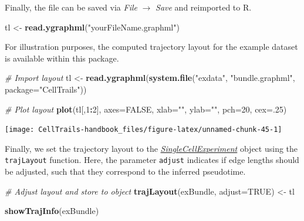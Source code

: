 \documentclass[]{book}
\newenvironment{Shaded}{\begin{snugshade}}{\end{snugshade}}
\newcommand{\KeywordTok}[1]{\textcolor[rgb]{0.13,0.29,0.53}{\textbf{#1}}}
\newcommand{\DataTypeTok}[1]{\textcolor[rgb]{0.13,0.29,0.53}{#1}}
\newcommand{\DecValTok}[1]{\textcolor[rgb]{0.00,0.00,0.81}{#1}}
\newcommand{\StringTok}[1]{\textcolor[rgb]{0.31,0.60,0.02}{#1}}
\newcommand{\CommentTok}[1]{\textcolor[rgb]{0.56,0.35,0.01}{\textit{#1}}}
\newcommand{\OtherTok}[1]{\textcolor[rgb]{0.56,0.35,0.01}{#1}}
\newcommand{\OperatorTok}[1]{\textcolor[rgb]{0.81,0.36,0.00}{\textbf{#1}}}
\newcommand{\NormalTok}[1]{#1}
\theoremstyle{definition}
\theoremstyle{definition}
\theoremstyle{definition}
\theoremstyle{remark}
\begin{document}
Finally, the file can be saved via \emph{File} \(\rightarrow\)
\emph{Save} and reimported to R.

\begin{Shaded}
\begin{Highlighting}[]
\NormalTok{tl <-}\StringTok{ }\KeywordTok{read.ygraphml}\NormalTok{(}\StringTok{"yourFileName.graphml"}\NormalTok{)}
\end{Highlighting}
\end{Shaded}

For illustration purposes, the computed trajectory layout for the
example dataset is available within this package.

\begin{Shaded}
\begin{Highlighting}[]
\CommentTok{# Import layout}
\NormalTok{tl <-}\StringTok{ }\KeywordTok{read.ygraphml}\NormalTok{(}\KeywordTok{system.file}\NormalTok{(}\StringTok{"exdata"}\NormalTok{, }\StringTok{"bundle.graphml"}\NormalTok{, }
                                \DataTypeTok{package=}\StringTok{"CellTrails"}\NormalTok{))}

\CommentTok{# Plot layout}
\KeywordTok{plot}\NormalTok{(tl[,}\DecValTok{1}\OperatorTok{:}\DecValTok{2}\NormalTok{], }\DataTypeTok{axes=}\OtherTok{FALSE}\NormalTok{, }\DataTypeTok{xlab=}\StringTok{""}\NormalTok{, }\DataTypeTok{ylab=}\StringTok{""}\NormalTok{, }\DataTypeTok{pch=}\DecValTok{20}\NormalTok{, }\DataTypeTok{cex=}\NormalTok{.}\DecValTok{25}\NormalTok{)}
\end{Highlighting}
\end{Shaded}

\texttt{[image: CellTrails-handbook\_files/figure-latex/unnamed-chunk-45-1]}

Finally, we set the trajectory layout to the
\emph{\href{http://bioconductor.org/packages/SingleCellExperiment}{SingleCellExperiment}}
object using the \texttt{trajLayout} function. Here, the parameter
\texttt{adjust} indicates if edge lengths should be adjusted, such that
they correspond to the inferred pseudotime.

\begin{Shaded}
\begin{Highlighting}[]
\CommentTok{# Adjust layout and store to object}
\KeywordTok{trajLayout}\NormalTok{(exBundle, }\DataTypeTok{adjust=}\OtherTok{TRUE}\NormalTok{) <-}\StringTok{ }\NormalTok{tl}

\KeywordTok{showTrajInfo}\NormalTok{(exBundle)}
\end{Highlighting}
\end{Shaded}
\end{document}
